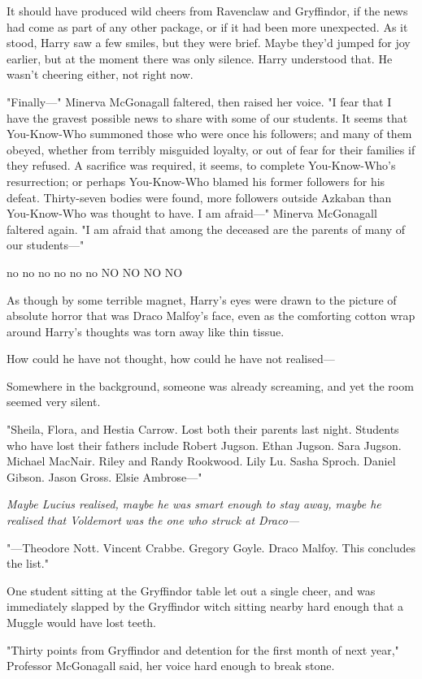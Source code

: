 It should have produced wild cheers from Ravenclaw and Gryffindor, if the news
had come as part of any other package, or if it had been more unexpected. As it
stood, Harry saw a few smiles, but they were brief. Maybe they'd jumped for joy
earlier, but at the moment there was only silence. Harry understood that. He
wasn't cheering either, not right now.

"Finally—" Minerva McGonagall faltered, then raised her voice. "I fear that I
have the gravest possible news to share with some of our students. It seems
that You-Know-Who summoned those who were once his followers; and many of them
obeyed, whether from terribly misguided loyalty, or out of fear for their
families if they refused. A sacrifice was required, it seems, to complete
You-Know-Who's resurrection; or perhaps You-Know-Who blamed his former
followers for his defeat. Thirty-seven bodies were found, more followers
outside Azkaban than You-Know-Who was thought to have. I am afraid—" Minerva
McGonagall faltered again. "I am afraid that among the deceased are the parents
of many of our students—"

no no no no no no NO NO NO NO

As though by some terrible magnet, Harry's eyes were drawn to the picture of
absolute horror that was Draco Malfoy's face, even as the comforting cotton
wrap around Harry's thoughts was torn away like thin tissue.

How could he have not thought, how could he have not realised—

Somewhere in the background, someone was already screaming, and yet the room
seemed very silent.

"Sheila, Flora, and Hestia Carrow. Lost both their parents last night. Students
who have lost their fathers include Robert Jugson. Ethan Jugson. Sara Jugson.
Michael MacNair. Riley and Randy Rookwood. Lily Lu. Sasha Sproch. Daniel
Gibson. Jason Gross. Elsie Ambrose—"

\emph{Maybe Lucius realised, maybe he was smart enough to stay away, maybe he
realised that Voldemort was the one who struck at Draco—}

"—Theodore Nott. Vincent Crabbe. Gregory Goyle. Draco Malfoy. This concludes
the list."

One student sitting at the Gryffindor table let out a single cheer, and was
immediately slapped by the Gryffindor witch sitting nearby hard enough that a
Muggle would have lost teeth.

"Thirty points from Gryffindor and detention for the first month of next year,"
Professor McGonagall said, her voice hard enough to break stone.

